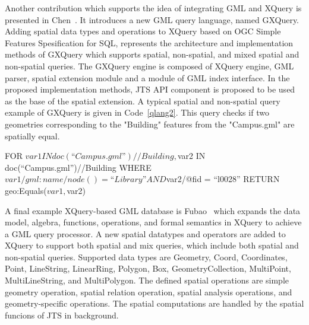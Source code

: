 \documentclass[a4paper,12pt]{article}
\begin{document}
Another contribution which supports the idea of integrating GML and XQuery is presented in Chen~\cite{Chen2010}.
It introduces a new GML query language, named GXQuery. 
Adding spatial data types and operations to XQuery based on OGC Simple Features Spesification for SQL, 
\cite{Chen2010} represents the architecture and implementation methods of GXQuery 
which supports spatial, non-spatial, and mixed spatial and non-spatial queries. 
The GXQuery engine is composed of XQuery engine, GML parser, spatial extension module 
and a module of GML index interface. 
In the proposed implementation methods, JTS API component is proposed 
to be used as the base of the spatial extension. 
A typical spatial and non-spatial query example of GXQuery is given in Code~\ref{qlang2}.
This query checks if two geometries corresponding to the "Building" features from the "Campus.gml" are spatially equal.
\vspace{10px}
\begin{fakeXML}[label=qlang2,caption=A typical example of combined spatial and non-spatial query in GXQuery.]
FOR $var1 IN doc(“Campus.gml”)//Building,
$var2 IN doc(“Campus.gml”)//Building
WHERE $var1/gml:name/node()=“Library”
AND $var2/@fid = “l0028” RETURN geo:Equals($var1, $var2)
\end{fakeXML}
\vspace{10px}

A final example XQuery-based GML database is Fubao~\cite{Fubao2010}
which expands the data model, algebra, functions, operations, and formal semantics in XQuery 
to achieve a GML query processor. 
A new spatial datatypes and operators are added to XQuery to support both spatial and mix queries, 
which include both spatial and non-spatial queries. 
Supported data types are  Geometry, Coord, Coordinates, Point, LineString, LinearRing, Polygon, Box, 
GeometryCollection, MultiPoint, MultiLineString, and MultiPolygon. 
The defined spatial operations are simple geometry operation, spatial relation operation, spatial analysis operations, and geometry-specific operations.
The spatial computations are handled by the spatial funcions of JTS in background.



\end{document}
